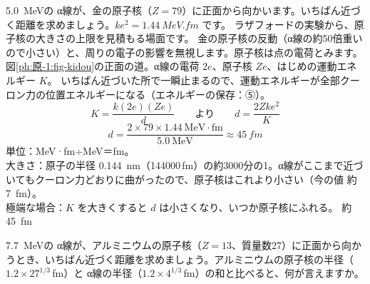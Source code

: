 \label{ph:原-1:ex9}
\begin{phreidai}[α線は原子核にどこまで近づくか]
\qty{5.0}{MeV}の α線が、金の原子核（$Z=79$）に正面から向かいます。いちばん近づく距離を求めましょう。$ke^2=\qty{1.44}{MeV.fm}$ です。
\phbamen
ラザフォードの実験から、原子核の大きさの上限を見積もる場面です。
\phmushi
金の原子核の反動（α線の約50倍重いので小さい）と、周りの電子の影響を無視します。原子核は点の電荷とみます。
\phzu
図\ref{ph:原-1:fig-kidou}の正面の道。α線の電荷 $2e$、原子核 $Ze$、はじめの運動エネルギー $K$。
\phriyu
いちばん近づいた所で一瞬止まるので、運動エネルギーが全部クーロン力の位置エネルギーになる（エネルギーの保存：⑤）。
\phtateru
\[ K=\frac{k(2e)(Ze)}{d}\qquad\text{より}\qquad d=\frac{2Zke^2}{K} \]
\phtoku
\[ d=\frac{2\times79\times1.44\ \mathrm{MeV\cdot fm}}{5.0\ \mathrm{MeV}}\approx\qty{45}{fm} \]
\phtashikame
単位：MeV·fm÷MeV＝fm。\\
大きさ：原子の半径 \qty{0.144}{nm}（\num{144000}\,fm）の約3000分の1。α線がここまで近づいてもクーロン力どおりに曲がったので、原子核はこれより小さい（今の値 約\qty{7}{fm}）。\\
極端な場合：$K$ を大きくすると $d$ は小さくなり、いつか原子核にふれる。
\kotae 約\qty{45}{fm}
\end{phreidai}
\begin{jibun}
\qty{7.7}{MeV}の α線が、アルミニウムの原子核（$Z=13$、質量数27）に正面から向かうとき、いちばん近づく距離を求めましょう。アルミニウムの原子核の半径（$1.2\times27^{1/3}$\,fm）と α線の半径（$1.2\times4^{1/3}$\,fm）の和と比べると、何が言えますか。
\end{jibun}


